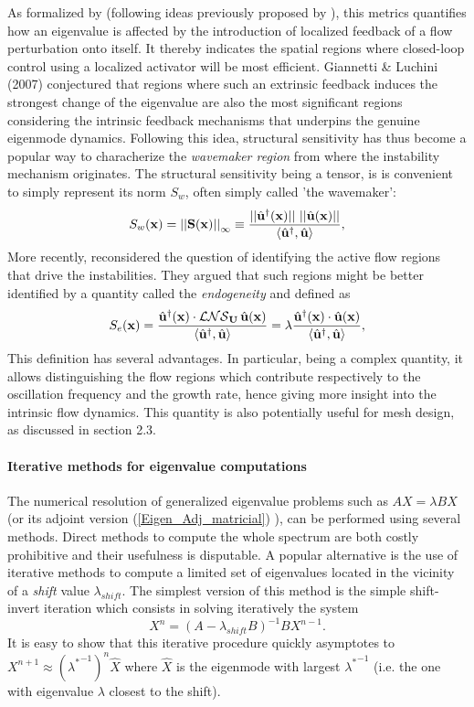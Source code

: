 \documentclass[twocolumn,10pt]{asme2ej}
\newcommand{\be}[1]{ \begin{equation} \label{#1}}
\newcommand{\ee}{\end{equation}}
\begin{document}
As formalized by \cite{GiannettiLuchini} (following ideas previously proposed by \cite{hill1992theoretical}), this metrics quantifies how an eigenvalue is affected by the introduction of localized feedback of a flow perturbation onto itself. It thereby indicates the spatial regions where closed-loop control using a localized activator will be most efficient. Giannetti \& Luchini (2007) conjectured that regions where such an extrinsic feedback induces the strongest change of the eigenvalue are also the most significant regions considering the intrinsic feedback mechanisms that underpins the genuine eigenmode dynamics. Following this idea, structural sensitivity has thus become a popular way to characherize the  {\em wavemaker region} from where the instability mechanism originates. The structural sensitivity being a tensor, is is convenient to simply represent its norm $S_w$, often simply called 'the wavemaker': 
\be{Structursens} 
S_w({\bf x}) =  {||{\bf{S}}({\bf{x}})||}_\infty \equiv \frac{ ||\hat{\bf u}^\dag({\bf x})|| \,\, ||\hat{\bf u}({\bf x})|| }{{\left<\hat{\bf u}^\dag, \hat{\bf u}\right>}},
\ee 
More recently, \cite{marquet2015endogeneity} reconsidered the question of identifying the active flow regions that drive the instabilities. They argued that such regions might be better identified by a quantity called the {\em endogeneity} and defined as  
\be{Endo} 
S_e({\bf x}) =  \frac{  \hat{\bf u}^\dag({\bf x}) \cdot  {\cal LNS}_{\bf U} \, \hat{\bf u}({\bf x})  }{{\left<\hat{\bf u}^\dag, \hat{\bf u}\right>}}  
= \lambda \frac{ \hat{\bf u}^\dag({\bf x}) \cdot \hat{\bf u}({\bf x}) }{{\left<\hat{\bf u}^\dag, \hat{\bf u}\right>}},
\ee 
This definition has several advantages. In particular, being a complex quantity, it allows distinguishing the flow regions which contribute respectively to the oscillation frequency and the growth rate, hence giving more insight into the intrinsic flow dynamics. This quantity is also potentially useful for mesh design, as discussed in section 2.3.


\paragraph{Iterative methods for eigenvalue computations}

The numerical resolution of generalized eigenvalue problems such as $A X = \lambda B X$ (or its adjoint version (\ref{Eigen_Adj_matricial}) ), 
can be performed using several methods. Direct methods to compute the whole spectrum are both costly prohibitive and their usefulness is disputable. A popular alternative is the use of iterative methods to compute a limited set of eigenvalues located in the vicinity of a 
{\em shift} value $\lambda_{shift}$. The simplest version of this method is the simple shift-invert iteration which consists in solving iteratively the system
$$
X^{n} =  (A- \lambda_{shift} B)^{-1} B X^{n-1}.
$$ 
It is easy to show that this iterative procedure quickly asymptotes to $X^{n+1} \approx ({\lambda^*}^{-1})^n \hat{X}$
where $\hat{X}$ is the eigenmode with largest ${\lambda^*}^{-1}$ (i.e. the one with eigenvalue $\lambda$ closest to the shift). 
\end{document}
